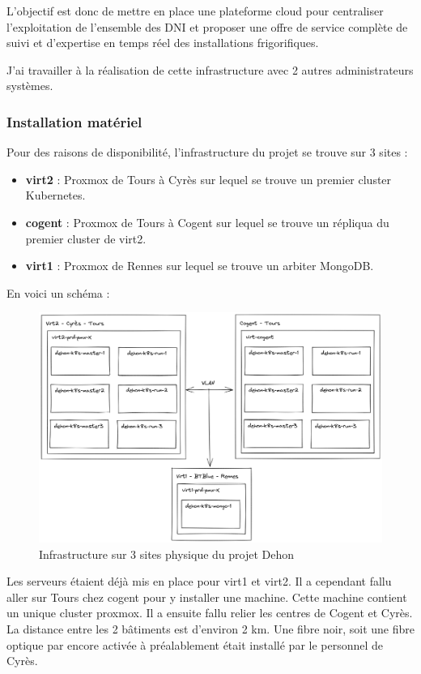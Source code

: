 \documentclass[12pt]{article}
\begin{document}
L'objectif est donc de mettre en place une plateforme cloud pour centraliser l'exploitation de l'ensemble des DNI et proposer une offre de service complète de suivi et d'expertise en temps réel des installations frigorifiques.

J'ai travailler à la réalisation de cette infrastructure avec 2 autres administrateurs systèmes.

\subsubsection{Installation matériel}
Pour des raisons de disponibilité, l'infrastructure du projet se trouve sur 3 sites :
\begin{itemize}
    \item \textbf{virt2} : Proxmox de Tours à Cyrès sur lequel se trouve un premier cluster Kubernetes.
    \item \textbf{cogent} : Proxmox de Tours à Cogent sur lequel se trouve un répliqua du premier cluster de virt2.
    \item \textbf{virt1} : Proxmox de Rennes sur lequel se trouve un arbiter MongoDB. 
\end{itemize}

\newpage
En voici un schéma :
\begin{figure}
    \centering
        \includegraphics[width=\textwidth]{src/Dehon1.png}
    \caption{Infrastructure sur 3 sites physique du projet Dehon}
    \label{fig:dehon1}
\end{figure}

Les serveurs étaient déjà mis en place pour virt1 et virt2. Il a cependant fallu aller sur Tours chez cogent pour y installer une machine. Cette machine contient un unique cluster proxmox. Il a ensuite fallu relier les centres de Cogent et Cyrès. La distance entre les 2 bâtiments est d'environ 2 km. Une fibre noir, soit une fibre optique par encore activée à préalablement était installé par le personnel de Cyrès.
\end{document}
